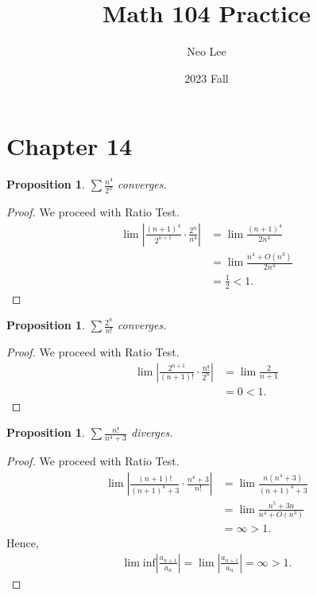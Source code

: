 \documentclass{article}
\title{Math 104 Practice}
\author{Neo Lee}
\date{2023 Fall}
\newtheorem{proposition}[thm]{Proposition}
\begin{document}
 

\maketitle 

\section*{Chapter 14}

\begin{proposition}
    $\sum \frac{n^4}{2^n}$ converges.
\end{proposition}
\begin{proof}
    We proceed with Ratio Test.
    \begin{align*}
        \lim\left|\frac{(n+1)^4}{2^{n+1}}\cdot\frac{2^n}{n^4}\right| &= \lim\frac{(n+1)^4}{2n^4} \\
        & = \lim \frac{n^4 + O(n^3)}{2n^4} \\
        & = \frac{1}{2} < 1.
    \end{align*}
\end{proof}

\begin{proposition}
    $\sum\frac{2^n}{n!}$ converges.
\end{proposition}
\begin{proof}
    We proceed with Ratio Test.
    \begin{align*}
        \lim\left|\frac{2^{n+1}}{(n+1)!}\cdot\frac{n!}{2^n}\right| &= \lim\frac{2}{n+1} \\
        & = 0 < 1.
    \end{align*}
\end{proof}

\begin{proposition}
    $\sum\frac{n!}{n^4+3}$ diverges.
\end{proposition}
\begin{proof}
    We proceed with Ratio Test.
    \begin{align*}
        \lim\left|\frac{(n+1)!}{(n+1)^4+3}\cdot\frac{n^4+3}{n!}\right| &= \lim\frac{n(n^4+3)}{(n+1)^4+3} \\
        & = \lim\frac{n^5+3n}{n^4 + O(n^3)} \\
        & = \infty > 1.
    \end{align*}
    Hence, 
    \begin{align*}
        \lim \mathrm{inf}\left|\frac{a_{n+1}}{a_n}\right| =\lim\left|\frac{a_{n+1}}{a_n}\right| =\infty > 1.
    \end{align*}
\end{proof}
\end{document}
